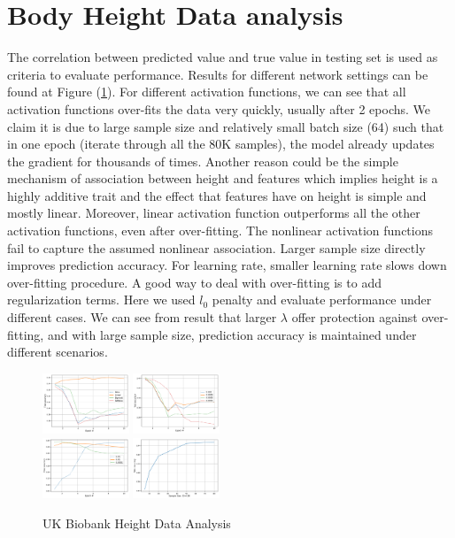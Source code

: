 \documentclass[acmtog, authorversion]{acmart}
\begin{document}
\section{Body Height Data analysis}
The correlation between predicted value and true value in testing set is used as criteria to evaluate performance. Results for different network settings can be found at Figure (\ref{fig:real1}). For different activation functions, we can see that all activation functions over-fits the data very quickly, usually after 2 epochs. We claim it is due to large sample size and relatively small batch size (64) such that in one epoch (iterate through all the 80K samples), the model already updates the gradient for thousands of times. Another reason could be the simple mechanism of association between height and features which implies height is a highly additive trait and the effect that features have on height is simple and mostly linear. Moreover, linear activation function outperforms all the other activation functions, even after over-fitting. The nonlinear activation functions fail to capture the assumed nonlinear association. Larger sample size directly improves prediction accuracy. For learning rate, smaller learning rate slows down over-fitting procedure. A good way to deal with over-fitting is to add regularization terms. Here we used $l_0$ penalty and evaluate performance under different cases. We can see from result that larger $\lambda$ offer protection against over-fitting, and with large sample size, prediction accuracy is maintained under different scenarios.
\begin{figure}[h]
  \centering
  \includegraphics[width=0.23\textwidth]{img/acc_vs_activation}
  \includegraphics[width=0.23\textwidth]{img/acc_vs_lr} \\
  \includegraphics[width=0.23\textwidth]{img/acc_vs_reg}
  \includegraphics[width=0.23\textwidth]{img/acc_vs_samplesize}
  \caption{UK Biobank Height Data Analysis}
  \label{fig:real1}
\end{figure}
\end{document}
